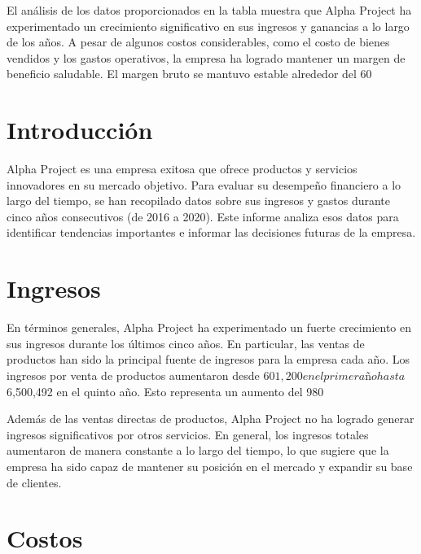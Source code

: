 
El análisis de los datos proporcionados en la tabla muestra que Alpha Project ha experimentado un crecimiento significativo en sus ingresos y ganancias a lo largo de los años. A pesar de algunos costos considerables, como el costo de bienes vendidos y los gastos operativos, la empresa ha logrado mantener un margen de beneficio saludable. El margen bruto se mantuvo estable alrededor del 60%

\section{Introducción}

Alpha Project es una empresa exitosa que ofrece productos y servicios innovadores en su mercado objetivo. Para evaluar su desempeño financiero a lo largo del tiempo, se han recopilado datos sobre sus ingresos y gastos durante cinco años consecutivos (de 2016 a 2020). Este informe analiza esos datos para identificar tendencias importantes e informar las decisiones futuras de la empresa.

\section{Ingresos}

En términos generales, Alpha Project ha experimentado un fuerte crecimiento en sus ingresos durante los últimos cinco años. En particular, las ventas de productos han sido la principal fuente de ingresos para la empresa cada año. Los ingresos por venta de productos aumentaron desde $601,200 en el primer año hasta $6,500,492 en el quinto año. Esto representa un aumento del 980%

Además de las ventas directas de productos, Alpha Project no ha logrado generar ingresos significativos por otros servicios. En general, los ingresos totales aumentaron de manera constante a lo largo del tiempo, lo que sugiere que la empresa ha sido capaz de mantener su posición en el mercado y expandir su base de clientes.

\section{Costos}

